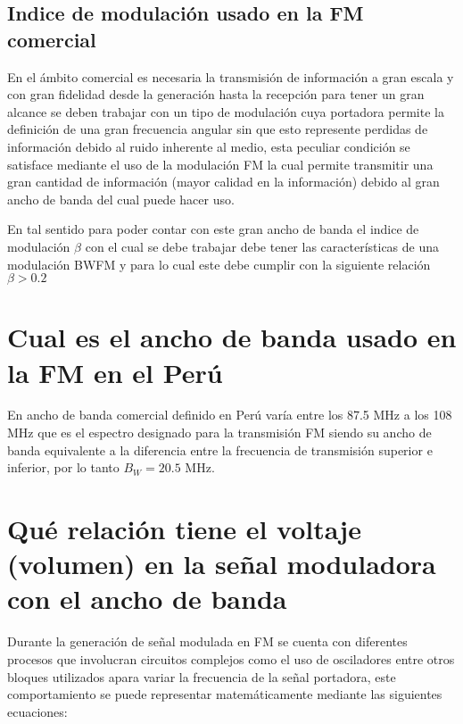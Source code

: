 \documentclass[]{article}
\begin{document}
	\subsection{Indice de modulación usado en la FM comercial}
	
	En el ámbito comercial es necesaria la transmisión de información a gran escala y con gran fidelidad desde la generación hasta la recepción para tener un gran alcance se deben trabajar con un tipo de modulación cuya portadora permite la definición de una gran frecuencia angular sin que esto represente perdidas de información debido al ruido inherente al medio, esta peculiar condición se satisface mediante el uso de la modulación FM la cual permite transmitir una gran cantidad de información (mayor calidad en la información) debido al gran ancho de banda del cual puede hacer uso.
	
	En tal sentido para poder contar con este gran ancho de banda el indice de modulación $\beta$ con el cual se debe trabajar debe tener las características de una modulación BWFM y para lo cual este debe cumplir con la siguiente relación $\beta > 0.2$
	
	\section{Cual es el ancho de banda usado en la FM en el Perú}
	
	En ancho de banda comercial definido en Perú varía entre los 87.5 MHz a los 108 MHz que es el espectro designado para la transmisión FM siendo su ancho de banda equivalente a la diferencia entre la frecuencia de transmisión superior e inferior, por lo tanto $B_W = 20.5$ MHz.
	
	\section{Qué relación tiene el voltaje (volumen) en la señal moduladora con el ancho de banda}
	
	Durante la generación de señal modulada en FM se cuenta con diferentes procesos que involucran circuitos complejos como el uso de osciladores entre otros bloques utilizados apara variar la frecuencia de la señal portadora, este comportamiento se puede representar matemáticamente mediante las siguientes ecuaciones: \\
	
\end{document}
